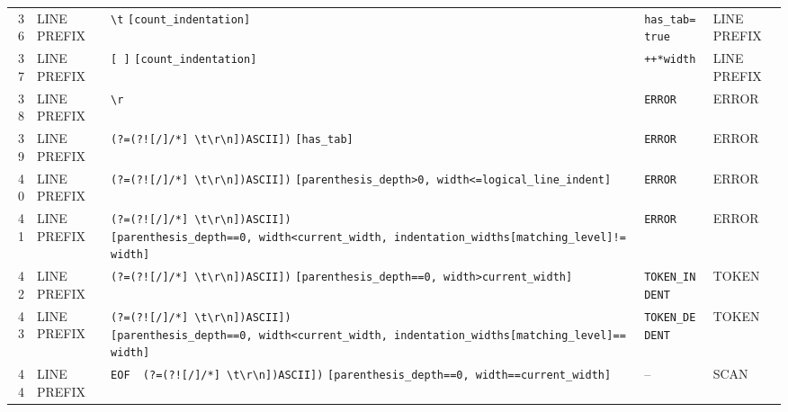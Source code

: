 \documentclass[a4paper,11pt]{article}
\begin{document}
\begin{landscape}
{\begin{longtable}{@{}r >{\raggedright\arraybackslash}p{4.0cm} >{\raggedright\arraybackslash}p{9.8cm} >{\raggedright\arraybackslash}p{5.4cm}>{\raggedright\arraybackslash}p{4.0cm}@{}}
36 & LINE PREFIX & \texttt{\textbackslash{}t} \texttt{{[}count\_indentation{]}\allowbreak{}} & \texttt{has\_tab=true} & LINE PREFIX \\
37 & LINE PREFIX & \texttt{{[}\ {]}\allowbreak{}} \texttt{{[}count\_indentation{]}\allowbreak{}} & \texttt{++*width} & LINE PREFIX \\
38 & LINE PREFIX & \texttt{\textbackslash{}r} & \texttt{ERROR} & ERROR \\
39 & LINE PREFIX & \texttt{(?=(?!{[}/{]}\allowbreak{}{[}/*{]}\allowbreak{}\textbar{}\allowbreak{}{[}\ \textbackslash{}t\textbackslash{}r\textbackslash{}n{]}\allowbreak{})\allowbreak{}{[}ASCII{]}\allowbreak{})\allowbreak{}} \texttt{{[}has\_tab{]}\allowbreak{}} & \texttt{ERROR} & ERROR \\
40 & LINE PREFIX & \texttt{(?=(?!{[}/{]}\allowbreak{}{[}/*{]}\allowbreak{}\textbar{}\allowbreak{}{[}\ \textbackslash{}t\textbackslash{}r\textbackslash{}n{]}\allowbreak{})\allowbreak{}{[}ASCII{]}\allowbreak{})\allowbreak{}} \texttt{{[}parenthesis\_depth\textgreater{}0,\allowbreak{}\ width\textless{}=logical\_line\_indent{]}\allowbreak{}} & \texttt{ERROR} & ERROR \\
41 & LINE PREFIX & \texttt{(?=(?!{[}/{]}\allowbreak{}{[}/*{]}\allowbreak{}\textbar{}\allowbreak{}{[}\ \textbackslash{}t\textbackslash{}r\textbackslash{}n{]}\allowbreak{})\allowbreak{}{[}ASCII{]}\allowbreak{})\allowbreak{}} \texttt{{[}parenthesis\_depth==0,\allowbreak{}\ width\textless{}current\_width,\allowbreak{}\ indentation\_widths{[}matching\_level{]}\allowbreak{}!=width{]}\allowbreak{}} & \texttt{ERROR} & ERROR \\
42 & LINE PREFIX & \texttt{(?=(?!{[}/{]}\allowbreak{}{[}/*{]}\allowbreak{}\textbar{}\allowbreak{}{[}\ \textbackslash{}t\textbackslash{}r\textbackslash{}n{]}\allowbreak{})\allowbreak{}{[}ASCII{]}\allowbreak{})\allowbreak{}} \texttt{{[}parenthesis\_depth==0,\allowbreak{}\ width\textgreater{}current\_width{]}\allowbreak{}} & \texttt{TOKEN\_INDENT} & TOKEN \\
43 & LINE PREFIX & \texttt{(?=(?!{[}/{]}\allowbreak{}{[}/*{]}\allowbreak{}\textbar{}\allowbreak{}{[}\ \textbackslash{}t\textbackslash{}r\textbackslash{}n{]}\allowbreak{})\allowbreak{}{[}ASCII{]}\allowbreak{})\allowbreak{}} \texttt{{[}parenthesis\_depth==0,\allowbreak{}\ width\textless{}current\_width,\allowbreak{}\ indentation\_widths{[}matching\_level{]}\allowbreak{}==width{]}\allowbreak{}} & \texttt{TOKEN\_DEDENT} & TOKEN \\
44 & LINE PREFIX & \texttt{EOF\ \textbar{}\allowbreak{}\ (?=(?!{[}/{]}\allowbreak{}{[}/*{]}\allowbreak{}\textbar{}\allowbreak{}{[}\ \textbackslash{}t\textbackslash{}r\textbackslash{}n{]}\allowbreak{})\allowbreak{}{[}ASCII{]}\allowbreak{})\allowbreak{}} \texttt{{[}parenthesis\_depth==0,\allowbreak{}\ width==current\_width{]}\allowbreak{}} & -- & SCAN \\

\end{longtable}}
\end{landscape}
\end{document}

